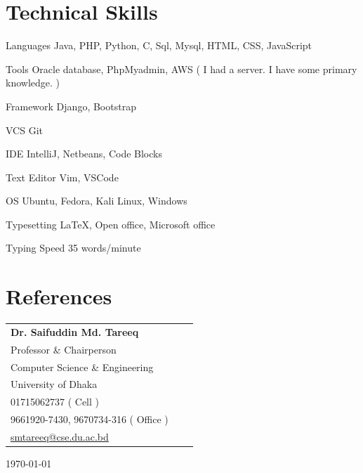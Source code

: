 \documentclass[a4paper,12pt]{article}
\begin{document}

\section{Technical Skills}

\begin{CV}
\item[Languages]  Java, PHP, Python, C, Sql, Mysql, HTML, CSS, JavaScript
\item[Tools] Oracle database, PhpMyadmin, AWS ( I had a server. I have some primary knowledge. )
\item[Framework] Django, Bootstrap
\item[VCS] Git
\item[IDE] IntelliJ, Netbeans, Code Blocks
\item[Text Editor] Vim, VSCode
\item[OS] Ubuntu, Fedora, Kali Linux, Windows
\item[Typesetting] \LaTeX{}, Open office, Microsoft office
\item[Typing Speed] 35 words/minute 
\end{CV}
\section{References}

\begin{table}[h]
\begin{tabular}{@{}lll@{}}
  \textbf{Dr. Saifuddin Md. Tareeq}\\
  Professor \& Chairperson\\
Computer Science \& Engineering\\
University of Dhaka\\
\faPhone{} 01715062737 ( Cell )\\
\faPhone{} 9661920-7430, 9670734-316 ( Office )\\
\faEnvelopeO{} \href{mailto:smtareeq@cse.du.ac.bd}{smtareeq@cse.du.ac.bd}\\
\end{tabular}
\end{table}

\noindent \today
\end{document}
